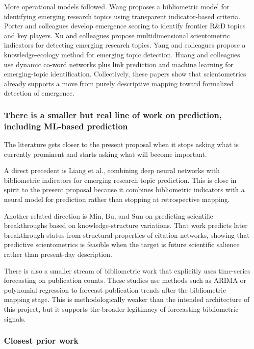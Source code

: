 \documentclass[
]{article}
\begin{document}
More operational models followed. Wang proposes a bibliometric model for
identifying emerging research topics using transparent indicator-based
criteria. Porter and colleagues develop emergence scoring to identify
frontier R\&D topics and key players. Xu and colleagues propose
multidimensional scientometric indicators for detecting emerging
research topics. Yang and colleagues propose a knowledge-ecology method
for emerging topic detection. Huang and colleagues use dynamic co-word
networks plus link prediction and machine learning for emerging-topic
identification. Collectively, these papers show that scientometrics
already supports a move from purely descriptive mapping toward
formalized detection of emergence.

\subsubsection{There is a smaller but real line of work on
prediction, including ML-based
prediction}\label{3-there-is-a-smaller-but-real-line-of-work-on-prediction-including-ml-based-prediction}

The literature gets closer to the present proposal when it stops asking
what is currently prominent and starts asking what will become
important.

A direct precedent is Liang et al., combining deep neural networks with
bibliometric indicators for emerging research topic prediction. This is
close in spirit to the present proposal because it combines bibliometric
indicators with a neural model for prediction rather than stopping at
retrospective mapping.

Another related direction is Min, Bu, and Sun on predicting scientific
breakthroughs based on knowledge-structure variations. That work
predicts later breakthrough status from structural properties of
citation networks, showing that predictive scientometrics is feasible
when the target is future scientific salience rather than present-day
description.

There is also a smaller stream of bibliometric work that explicitly uses
time-series forecasting on publication counts. These studies use methods
such as ARIMA or polynomial regression to forecast publication trends
after the bibliometric mapping stage. This is methodologically weaker
than the intended architecture of this project, but it supports the
broader legitimacy of forecasting bibliometric signals.

\subsubsection{Closest prior work}\label{closest-prior-work}
\end{document}
